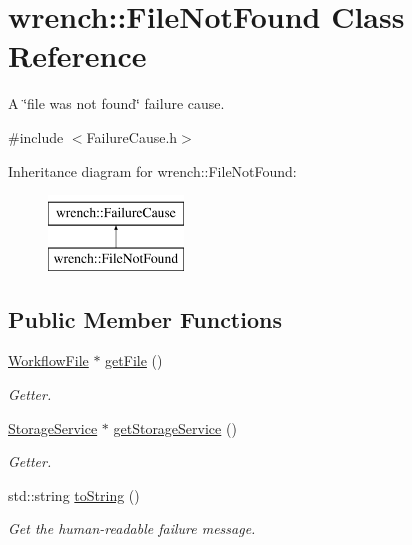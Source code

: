 \hypertarget{classwrench_1_1_file_not_found}{}\section{wrench\+:\+:File\+Not\+Found Class Reference}
\label{classwrench_1_1_file_not_found}


A \char`\"{}file was not found\char`\"{} failure cause.  




{\ttfamily \#include $<$Failure\+Cause.\+h$>$}

Inheritance diagram for wrench\+:\+:File\+Not\+Found\+:\begin{figure}[H]
\begin{center}
\leavevmode
\includegraphics[height=2.000000cm]{classwrench_1_1_file_not_found}
\end{center}
\end{figure}
\subsection*{Public Member Functions}
\begin{DoxyCompactItemize}
\item 
\hyperlink{classwrench_1_1_workflow_file}{Workflow\+File} $\ast$ \hyperlink{classwrench_1_1_file_not_found_aa89df5eaeb42af70876ac6ce084de33d}{get\+File} ()
\begin{DoxyCompactList}\small\item\em Getter. \end{DoxyCompactList}\item 
\hyperlink{classwrench_1_1_storage_service}{Storage\+Service} $\ast$ \hyperlink{classwrench_1_1_file_not_found_ac831b3a371f81e56bfac869fd4113514}{get\+Storage\+Service} ()
\begin{DoxyCompactList}\small\item\em Getter. \end{DoxyCompactList}\item 
std\+::string \hyperlink{classwrench_1_1_file_not_found_ac9c3bdcc58b4626a0f3de0b4288bf4b4}{to\+String} ()
\begin{DoxyCompactList}\small\item\em Get the human-\/readable failure message. \end{DoxyCompactList}\end{DoxyCompactItemize}
